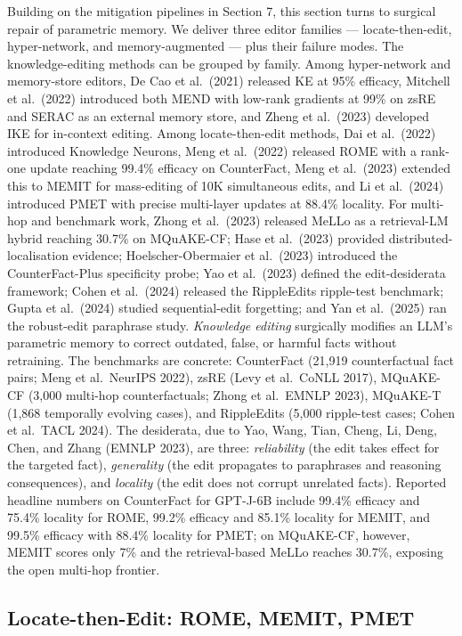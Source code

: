 \documentclass{article}
\begin{document}
Building on the mitigation pipelines in Section 7, this section turns to surgical repair of parametric memory. We deliver three editor families --- locate-then-edit, hyper-network, and memory-augmented --- plus their failure modes. The knowledge-editing methods can be grouped by family. Among hyper-network and memory-store editors, De Cao et al.~(2021) released KE at 95\% efficacy, Mitchell et al.~(2022) introduced both MEND with low-rank gradients at 99\% on zsRE and SERAC as an external memory store, and Zheng et al.~(2023) developed IKE for in-context editing. Among locate-then-edit methods, Dai et al.~(2022) introduced Knowledge Neurons, Meng et al.~(2022) released ROME with a rank-one update reaching 99.4\% efficacy on CounterFact, Meng et al.~(2023) extended this to MEMIT for mass-editing of 10K simultaneous edits, and Li et al.~(2024) introduced PMET with precise multi-layer updates at 88.4\% locality. For multi-hop and benchmark work, Zhong et al.~(2023) released MeLLo as a retrieval-LM hybrid reaching 30.7\% on MQuAKE-CF; Hase et al.~(2023) provided distributed-localisation evidence; Hoelscher-Obermaier et al.~(2023) introduced the CounterFact-Plus specificity probe; Yao et al.~(2023) defined the edit-desiderata framework; Cohen et al.~(2024) released the RippleEdits ripple-test benchmark; Gupta et al.~(2024) studied sequential-edit forgetting; and Yan et al.~(2025) ran the robust-edit paraphrase study. \emph{Knowledge editing} surgically modifies an LLM's parametric memory to correct outdated, false, or harmful facts without retraining. The benchmarks are concrete: CounterFact (21,919 counterfactual fact pairs; Meng et al.~NeurIPS 2022), zsRE (Levy et al.~CoNLL 2017), MQuAKE-CF (3,000 multi-hop counterfactuals; Zhong et al.~EMNLP 2023), MQuAKE-T (1,868 temporally evolving cases), and RippleEdits (5,000 ripple-test cases; Cohen et al.~TACL 2024). The desiderata, due to Yao, Wang, Tian, Cheng, Li, Deng, Chen, and Zhang (EMNLP 2023), are three: \emph{reliability} (the edit takes effect for the targeted fact), \emph{generality} (the edit propagates to paraphrases and reasoning consequences), and \emph{locality} (the edit does not corrupt unrelated facts). Reported headline numbers on CounterFact for GPT-J-6B include 99.4\% efficacy and 75.4\% locality for ROME, 99.2\% efficacy and 85.1\% locality for MEMIT, and 99.5\% efficacy with 88.4\% locality for PMET; on MQuAKE-CF, however, MEMIT scores only 7\% and the retrieval-based MeLLo reaches 30.7\%, exposing the open multi-hop frontier.

\subsection{Locate-then-Edit: ROME, MEMIT, PMET}\label{locate-then-edit-rome-memit-pmet}
\end{document}
